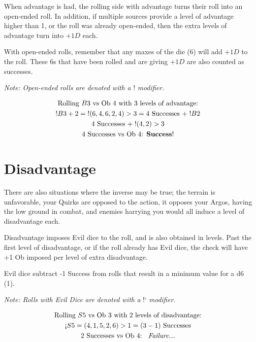 \documentclass[../main.tex]{subfiles}
\begin{document}
        When advantage is had, the rolling side with advantage turns their roll into an open-ended roll. In addition, if multiple sources provide a level of advantage higher than 1, or the roll was already open-ended, then the extra levels of advantage turn into $+1D$ each.

        With open-ended rolls, remember that any maxes of the die (6) will add $+1D$ to the roll. These 6s that have been rolled and are giving $+1D$ are also counted as successes. 
        
        \emph{Note: Open-ended rolls are denoted with a $!$ modifier.}
        \begin{mdframed}[style=Arrata]
            \begin{equation*}
                \begin{gathered}
                    \text{Rolling $B$3 vs Ob 4 with 3 levels of advantage:}         \\
                    !B3 + 2 = \; !(6, 4, 6, 2, 4)>3 = 4 \text{ Successes } +\; !B2  \\
                    4 \text{ Successes } +\; !(4, 2)>3                              \\
                    4 \text{ Successes  vs Ob 4: \textbf{Success}!}
                \end{gathered}
            \end{equation*}    
        \end{mdframed}

    \section{Disadvantage}

        There are also situations where the inverse may be true; the terrain is unfavorable, your Quirks are opposed to the action, it opposes your Argos, having the low ground in combat, and enemies harrying you would all induce a level of disadvantage each.

        Disadvantage imposes Evil dice to the roll, and is also obtained in levels. Past the first level of disadvantage, or if the roll already has Evil dice, the check will have +1 Ob imposed per level of extra disadvantage.

        Evil dice subtract -1 Success from rolls that result in a minimum value for a d6 (1). 
        
        \emph{Note: Rolls with Evil Dice are denoted with a} !` \emph{modifier.}
        \begin{mdframed}[style=Arrata]
            \begin{equation*}
                \begin{gathered}
                    \text{Rolling $S5$ vs Ob 3 with 2 levels of disadvantage:}      \\
                    \text{!`}S5 = (4, 1, 5, 2, 6)>1 = (3 - 1) \text{ Successes}     \\
                    2 \text{ Successes vs Ob 4: \emph{ Failure...}}
                \end{gathered}
            \end{equation*}
        \end{mdframed}
\end{document}
